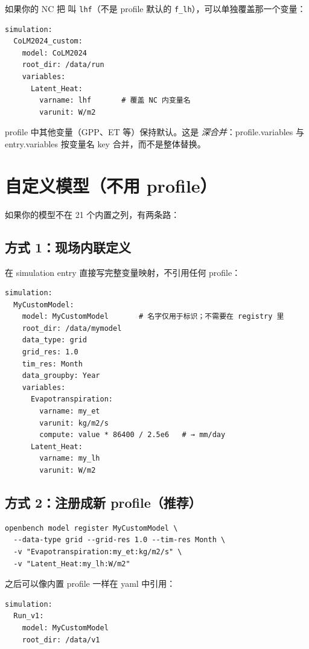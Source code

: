 如果你的 NC 把  叫 \texttt{lhf}（不是 profile 默认的 \texttt{f\_lh}），可以单独覆盖那一个变量：

\begin{verbatim}
simulation:
  CoLM2024_custom:
    model: CoLM2024
    root_dir: /data/run
    variables:
      Latent_Heat:
        varname: lhf       # 覆盖 NC 内变量名
        varunit: W/m2
\end{verbatim}

profile 中其他变量（GPP、ET 等）保持默认。这是 \emph{深合并}：profile.variables 与 entry.variables 按变量名 key 合并，而不是整体替换。

\section{自定义模型（不用 profile）}

如果你的模型不在 21 个内置之列，有两条路：

\subsection{方式 1：现场内联定义}

在 simulation entry 直接写完整变量映射，不引用任何 profile：

\begin{verbatim}
simulation:
  MyCustomModel:
    model: MyCustomModel       # 名字仅用于标识；不需要在 registry 里
    root_dir: /data/mymodel
    data_type: grid
    grid_res: 1.0
    tim_res: Month
    data_groupby: Year
    variables:
      Evapotranspiration:
        varname: my_et
        varunit: kg/m2/s
        compute: value * 86400 / 2.5e6   # → mm/day
      Latent_Heat:
        varname: my_lh
        varunit: W/m2
\end{verbatim}

\subsection{方式 2：注册成新 profile（推荐）}

\begin{verbatim}
openbench model register MyCustomModel \
  --data-type grid --grid-res 1.0 --tim-res Month \
  -v "Evapotranspiration:my_et:kg/m2/s" \
  -v "Latent_Heat:my_lh:W/m2"
\end{verbatim}

之后可以像内置 profile 一样在 yaml 中引用：

\begin{verbatim}
simulation:
  Run_v1:
    model: MyCustomModel
    root_dir: /data/v1
\end{verbatim}

